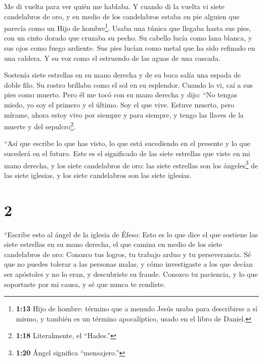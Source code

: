  Me di vuelta para ver quién me hablaba. Y cuando di la
vuelta vi siete candelabros de oro,  y en medio de los
candelabros estaba en pie alguien que parecía como un Hijo de
hombre\footnote{\textbf{1:13} Hijo de hombre: término que a menudo Jesús
  usaba para describirse a sí mismo, y también es un término
  apocalíptico, usado en el libro de Daniel.}. Usaba una túnica que
llegaba hasta sus pies, con un cinto dorado que cruzaba su pecho.
 Su cabello lucía como lana blanca, y sus ojos como fuego
ardiente.  Sus pies lucían como metal que ha sido refinado
en una caldera. Y su voz como el estruendo de las aguas de una cascada.

 Sostenía siete estrellas en su mano derecha y de su boca
salía una espada de doble filo. Su rostro brillaba como el sol en su
esplendor.  Cuando lo vi, caí a sus pies como muerto. Pero
él me tocó con su mano derecha y dijo: ``No tengas miedo, yo soy el
primero y el último.  Soy el que vive. Estuve muerto, pero
mírame, ahora estoy vivo por siempre y para siempre, y tengo las llaves
de la muerte y del sepulcro\footnote{\textbf{1:18} Literalmente, el
  ``Hades.''}.

 ``Así que escribe lo que has visto, lo que está sucediendo
en el presente y lo que sucederá en el futuro.  Este es el
significado de las siete estrellas que viste en mi mano derecha, y los
siete candelabros de oro: las siete estrellas son los ángeles\footnote{\textbf{1:20}
  Ángel significa ``mensajero.''} de las siete iglesias, y los siete
candelabros son las siete iglesias.

\hypertarget{section-1}{%
\section{2}\label{section-1}}

 ``Escribe esto al ángel de la iglesia de Éfeso: Esto es lo
que dice el que sostiene las siete estrellas en su mano derecha, el que
camina en medio de los siete candelabros de oro:  Conozco
tus logros, tu trabajo arduo y tu perseverancia. Sé que no puedes
tolerar a las personas malas, y cómo investigaste a los que decían ser
apóstoles y no lo eran, y descubriste su fraude.  Conozco tu
paciencia, y lo que soportaste por mi causa, y sé que nunca te rendiste.

